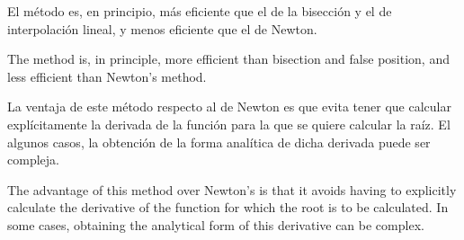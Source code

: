 \begin{paracol}{2}
\switchcolumn
 El método es, en principio, más eficiente que el de la bisección y el de interpolación lineal, y menos eficiente que el de Newton.
\switchcolumn

 The method is, in principle, more efficient than bisection and false position, and less efficient than Newton's method.

 \switchcolumn
 La ventaja de este método respecto al de Newton es que evita tener que calcular explícitamente la derivada de la función para la que se quiere calcular la raíz. El algunos casos, la obtención de la forma analítica de dicha derivada puede ser compleja.   
\switchcolumn

The advantage of this method over Newton's is that it avoids having to explicitly calculate the derivative of the function for which the root is to be calculated. In some cases, obtaining the analytical form of this derivative can be complex.  

\end{paracol}

